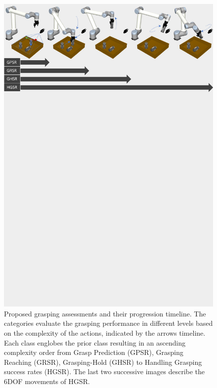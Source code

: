 \begin{figure}[h!] %
\begin{tcolorbox}
\centerline{\includegraphics[trim={0cm 19.5cm 0cm 0.07cm},clip,width=1\linewidth,angle=0]{Cap2/Figuras/teste_2.pdf}}
\end{tcolorbox}
\caption{Proposed grasping assessments and their progression timeline. The categories evaluate the grasping performance in different levels based on the complexity of the actions, indicated by the arrows timeline. Each class englobes the prior class resulting in an ascending complexity order from Grasp Prediction (GPSR), Grasping Reaching (GRSR), Grasping-Hold (GHSR) to Handling Grasping success rates (HGSR). The last two successive images describe the 6DOF movements of HGSR.}
\label{fig:eval}
\end{figure}

